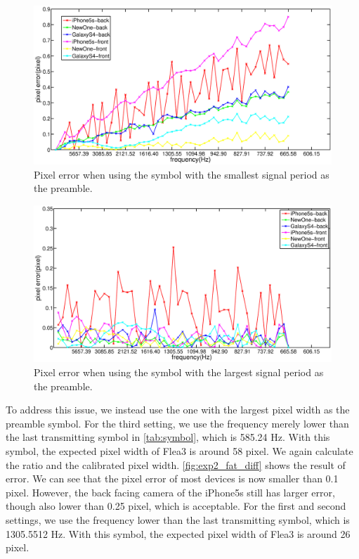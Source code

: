 \begin{figure}[!htb]
  \hspace{-5em}
  \includegraphics[scale=0.2]{fig/exp2_tr_error_thin.eps}
  \caption{Pixel error when using the symbol with the smallest signal period as the preamble.}
  \label{fig:exp2_thin_diff}
\end{figure}
\begin{figure}[!htb]
  \hspace{-5em}
  \includegraphics[scale=0.2]{fig/exp2_tr_error.eps}
  \caption{Pixel error when using the symbol with the largest signal period as the preamble.}
  \label{fig:exp2_fat_diff}
\end{figure}

To address this issue, we instead use the one with the largest pixel width as the preamble symbol. For the third setting, we use the frequency merely lower than the last transmitting symbol in \autoref{tab:symbol}, which is 585.24 Hz. With this symbol, the expected pixel width of Flea3 is around 58 pixel. We again calculate the ratio and the calibrated pixel width. \autoref{fig:exp2_fat_diff} shows the result of error. We can see that the pixel error of most devices is now smaller than 0.1 pixel. However, the back facing camera of the iPhone5s still has larger error, though also lower than 0.25 pixel, which is acceptable. For the first and second settings, we use the frequency lower than the last transmitting symbol, which is 1305.5512 Hz. With this symbol, the expected pixel width of Flea3 is around 26 pixel.


